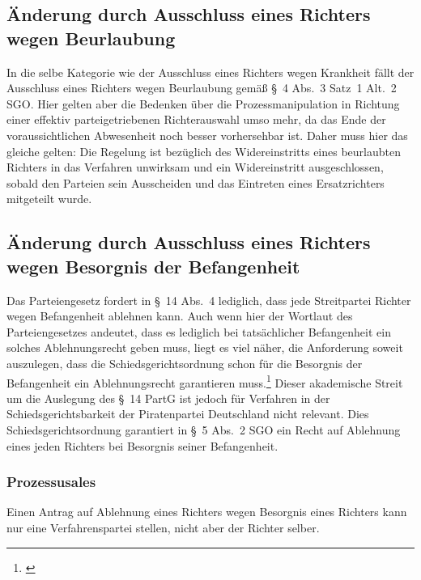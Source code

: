 \subsection{Änderung durch Ausschluss eines Richters wegen Beurlaubung}
\label{Zusammensetzung:Spruchkoerper:Urlaub}
In die selbe Kategorie wie der Ausschluss eines Richters wegen Krankheit fällt der Ausschluss eines Richters wegen Beurlaubung gemäß \S~4 Abs.~3 Satz~1 Alt.~2 SGO.
Hier gelten aber die Bedenken über die Prozessmanipulation in Richtung einer effektiv parteigetriebenen Richterauswahl umso mehr, da das Ende der voraussichtlichen Abwesenheit noch besser vorhersehbar ist.
Daher muss hier das gleiche gelten: Die Regelung ist bezüglich des Widereinstritts eines beurlaubten Richters in das Verfahren unwirksam und ein Widereinstritt ausgeschlossen, sobald den Parteien sein Ausscheiden und das Eintreten eines Ersatzrichters mitgeteilt wurde.

\subsection{Änderung durch Ausschluss eines Richters wegen Besorgnis der Befangenheit}
\label{Zusammensetzung:Spruchkoerper:Befangenheitsbesorgnis}
Das Parteiengesetz fordert in \S~14 Abs.~4 lediglich, dass jede Streitpartei Richter wegen Befangenheit ablehnen kann.
Auch wenn hier der Wortlaut des Parteiengesetzes andeutet, dass es lediglich bei tatsächlicher Befangenheit ein solches Ablehnungsrecht geben muss, liegt es viel näher, die Anforderung soweit auszulegen, dass die Schiedsgerichtsordnung schon für die Besorgnis der Befangenheit ein Ablehnungsrecht garantieren muss.\footnote{\cites[Wißmann][\S~14 Rn~32]{kersten2007parteiengesetz}[Lenski][\S~14 Rn~23]{lenski2011parteiengesetz}}
Dieser akademische Streit um die Auslegung des \S~14 PartG ist jedoch für Verfahren in der Schiedsgerichtsbarkeit der Piratenpartei Deutschland nicht relevant.
Dies Schiedsgerichtsordnung garantiert in \S~5 Abs.~2 SGO ein Recht auf Ablehnung eines jeden Richters bei Besorgnis seiner Befangenheit.


\subsubsection{Prozessusales}
\label{Zusammensetzung:Spruchkoerper:Befangenheitsbesorgnis:Prozessuales}
Einen Antrag auf Ablehnung eines Richters wegen Besorgnis eines Richters kann nur eine Verfahrenspartei stellen, nicht aber der Richter selber.

